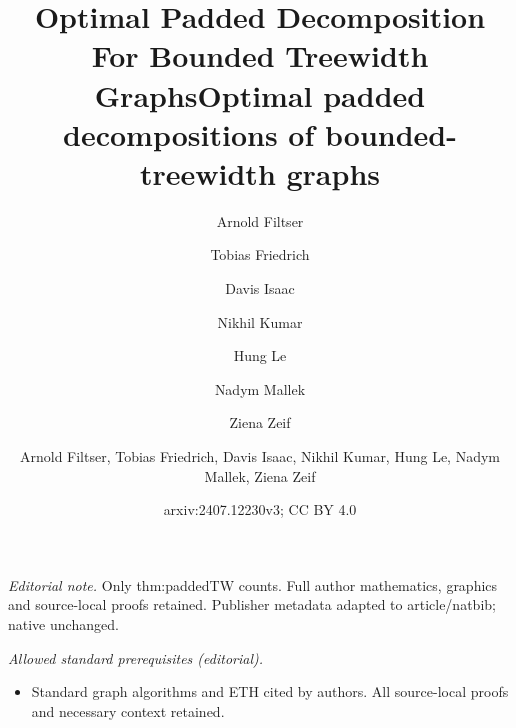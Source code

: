 \documentclass{article}
\author{Arnold Filtser \and Tobias Friedrich \and Davis Isaac \and Nikhil Kumar \and Hung Le \and Nadym Mallek \and Ziena Zeif}\date{}
\title{Optimal Padded Decomposition For Bounded Treewidth Graphs}
\title{Optimal padded decompositions of bounded-treewidth graphs}
\author{Arnold Filtser, Tobias Friedrich, Davis Isaac, Nikhil Kumar, Hung Le, Nadym Mallek, Ziena Zeif}
\date{arxiv:2407.12230v3; CC BY 4.0}
\begin{document}
\maketitle
\noindent\textit{Editorial note.} Only thm:paddedTW counts. Full author mathematics, graphics and source-local proofs retained. Publisher metadata adapted to article/natbib; native unchanged.\par\medskip
\noindent\textit{Allowed standard prerequisites (editorial).}\begin{itemize}
\item Standard graph algorithms and ETH cited by authors. All source-local proofs and necessary context retained.
\end{itemize}\medskip
\maketitle
\end{document}
